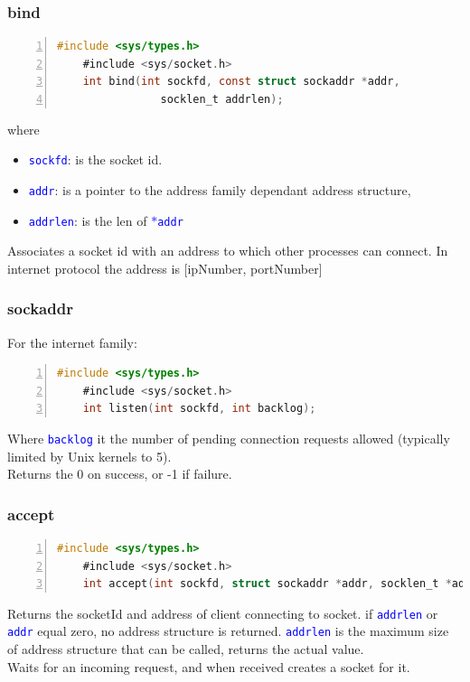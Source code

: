 \documentclass[12pt]{beamer}
\begin{document}
\begin{frame}[fragile]
	\frametitle{bind}
	{\tiny
	\begin{lstlisting}[language=C, breaklines=true, commentstyle=\color{mygreen},frame=lrtb,  rulecolor=\color{black}, numbers=left,  numbersep=5pt, numberstyle=\tiny\color{mygray}]
	#include <sys/types.h>
	#include <sys/socket.h>
	int bind(int sockfd, const struct sockaddr *addr,
                socklen_t addrlen);
	\end{lstlisting}}
	{\footnotesize
	where 
	\begin{itemize}
		\item \texttt{\textcolor{blue}{sockfd}}: is the socket id.
		\item \texttt{\textcolor{blue}{addr}}: is a pointer to the address family dependant address structure,
		\item \texttt{\textcolor{blue}{addrlen}}: is the len of \texttt{\textcolor{blue}{$\ast$addr}}
	\end{itemize}
	Associates a socket id with an address to which other processes can connect. In internet protocol the address is [ipNumber, portNumber]
	}
\end{frame}

\begin{frame}[fragile]
	\frametitle{sockaddr}
	{\footnotesize For the internet family:}
	{\tiny
	\begin{lstlisting}[language=C, breaklines=true, commentstyle=\color{mygreen},frame=lrtb,  rulecolor=\color{black}, numbers=left,  numbersep=5pt, numberstyle=\tiny\color{mygray}]
	#include <sys/types.h> 
	#include <sys/socket.h>
	int listen(int sockfd, int backlog);
	\end{lstlisting}}
	{\footnotesize
	Where \texttt{\textcolor{blue}{backlog}} it the number of pending connection requests allowed (typically limited by Unix kernels to 5). \\ Returns the 0 on success, or -1 if failure.
	}
\end{frame}

\begin{frame}[fragile]
	\frametitle{accept}
	{\tiny
	\begin{lstlisting}[language=C, breaklines=true, commentstyle=\color{mygreen},frame=lrtb,  rulecolor=\color{black}, numbers=left,  numbersep=5pt, numberstyle=\tiny\color{mygray}]
	#include <sys/types.h>
	#include <sys/socket.h>
	int accept(int sockfd, struct sockaddr *addr, socklen_t *addrlen);
	\end{lstlisting}}
	{\footnotesize
	Returns the socketId and address of client connecting to socket. if \texttt{\textcolor{blue}{addrlen}} or \texttt{\textcolor{blue}{addr}} equal zero, no address structure is returned. \texttt{\textcolor{blue}{addrlen}} is the maximum size of address structure that can be called, returns the actual value. \\Waits for an incoming request, and when received creates a socket for it.
	}
\end{frame}
\end{document}
